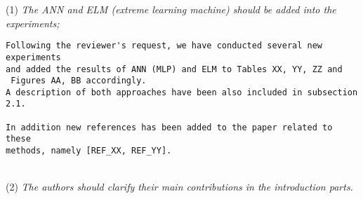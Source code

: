 \documentclass[preprint]{elsarticle}
\begin{document}
\noindent (1) \emph{The ANN and ELM (extreme learning machine) should be added into the experiments; } 

\begin{verbatim}
Following the reviewer's request, we have conducted several new experiments 
and added the results of ANN (MLP) and ELM to Tables XX, YY, ZZ and
 Figures AA, BB accordingly. 
A description of both approaches have been also included in subsection 2.1.

In addition new references has been added to the paper related to these 
methods, namely [REF_XX, REF_YY].
\end{verbatim}


~\\
\noindent (2) \emph{The authors should clarify their main contributions in the introduction parts.}
\end{document}
